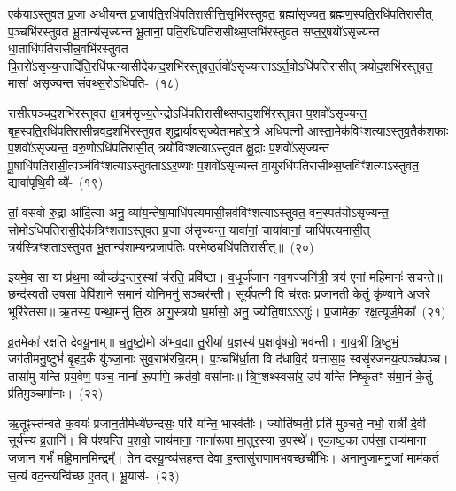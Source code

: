एक॑याऽस्तुवत प्र॒जा अ॑धीयन्त प्र॒जा\-प॑ति॒रधि॑\-पतिरासीत्ति॒सृभि॑\-रस्तुवत॒ ब्रह्मा॑सृज्यत॒ ब्रह्म॑ण॒स्पति॒रधि॑\-पतिरासीत् प॒ञ्चभि॑\-रस्तुवत भू॒तान्य॑सृज्यन्त भू॒तानां॒ पति॒रधि॑\-पतिरासीथ्स॒प्तभि॑\-रस्तुवत सप्त॒र्॒\mbox{}षयो॑\-ऽ\-सृज्यन्त धा॒ताधि॑\-पतिरा\-सीन्न॒वभि॑\-रस्तुवत पि॒तरो॑\-ऽसृज्य॒न्ता\-दि॑ति॒\-रधि॑\-पत्न्यासीदेकाद॒शभि॑\-रस्तुवत॒र्तवो॑\-ऽसृज्यन्ता\-ऽऽ\-र्त॒वो\-ऽधि॑\-पतिरासीत् त्रयोद॒शभि॑\-रस्तुवत॒ मासा॑ असृज्यन्त संवथ्स॒रो\-ऽधि॑\-पति-~(१८)\ip

रासीत्पञ्चद॒शभि॑\-रस्तुवत क्ष॒त्रम॑सृज्य॒तेन्द्रो\-ऽधि॑\-पतिरासीथ्सप्त\-द॒शभि॑\-रस्तुवत प॒शवो॑\-ऽसृज्यन्त॒ बृह॒स्पति॒\-रधि॑\-पतिरासी\-न्नव\-द॒शभि॑\-रस्तुवत शूद्रा॒र्याव॑सृज्येतामहोरा॒त्रे अधि॑पत्नी आस्ता॒\-मेक॑\-विꣳशत्या\-ऽ\-स्तुव॒तैक॑शफाः प॒शवो॑\-ऽसृज्यन्त॒ वरु॒णो\-ऽधि॑\-पतिरासी॒त् त्रयो॑\-विꣳशत्या\-ऽ\-स्तुवत क्षु॒द्राः प॒शवो॑\-ऽसृज्यन्त पू॒षाधि॑\-पतिरासी॒त्पञ्च॑विꣳशत्या\-ऽ\-स्तुवता\-ऽऽ\-र॒ण्याः प॒शवो॑\-ऽसृज्यन्त वा॒यु\-रधि॑\-पतिरासीथ्स॒प्तविꣳ॑शत्या\-ऽ\-स्तुवत॒ द्यावा॑\-पृथि॒वी व्यै॑-~(१९)\ip

तां॒ वस॑वो रु॒द्रा आ॑दि॒त्या अनु॒ व्या॑य॒न्तेषा॒माधि॑\-पत्यमासी॒न्नव॑\-विꣳशत्या\-ऽ\-स्तुवत॒ वन॒स्पत॑यो\-ऽसृज्यन्त॒ सोमो\-ऽ\-धि॑\-पतिरासी॒देक॑त्रिꣳशता\-ऽ\-स्तुवत प्र॒जा अ॑सृज्यन्त॒ यावा॑नां॒ चाया॑वानां॒ चाधि॑पत्यमासी॒त् त्रय॑स्त्रिꣳशता\-ऽ\-स्तुवत भू॒तान्य॑शाम्यन्प्र॒जा\-प॑तिः परमे॒ष्ठ्यधि॑\-पतिरासीत्॥~(२०)\ip

{\anuvakamend[{सं॒ व॒थ्स॒रो\-ऽधि॑\-पति॒र्वि पञ्च॑त्रिꣳशच्च}]}%

इ॒यमे॒व सा या प्र॑थ॒मा व्यौच्छ॑द॒न्तर॒स्यां च॑रति॒ प्रवि॑ष्टा। व॒धूर्ज॑जान नव॒गज्जनि॑त्री॒ त्रय॑ एनां महि॒मानः॑ सचन्ते॥ छन्द॑स्वती उ॒षसा॒ पेपि॑शाने समा॒नं योनि॒मनु॑ स॒ञ्चर॑न्ती। सूर्य॑पत्नी॒ वि च॑रतः प्रजान॒ती के॒तुं कृ॑ण्वा॒ने अ॒जरे॒ भूरि॑रेतसा॥ ऋ॒तस्य॒ पन्था॒मनु॑ ति॒स्र आगु॒स्त्रयो॑ घ॒र्मासो॒ अनु॒ ज्योति॒षा\-ऽऽ\-ऽगुः॑। प्र॒जामेका॒ रक्ष॒त्यूर्ज॒मेका᳚~(२१)\ip

व्र॒तमेका॑ रक्षति देवयू॒नाम्॥ च॒तु॒ष्टो॒मो अ॑भव॒द्या तु॒रीया॑ य॒ज्ञस्य॑ प॒क्षावृ॑षयो॒ भव॑न्ती। गा॒य॒त्रीं त्रि॒ष्टुभं॒ जग॑तीमनु॒ष्टुभं॑ बृ॒हद॒र्कं यु॑ञ्जा॒नाः सुव॒राभ॑रन्नि॒दम्॥ प॒ञ्चभि॑र्धा॒ता वि द॑धावि॒दं यत्तासा॒ꣴ॒ स्वसॄ॑रजनय॒त्पञ्च॑पञ्च। तासा॑मु यन्ति प्रय॒वेण॒ पञ्च॒ नाना॑ रू॒पाणि॒ क्रत॑वो॒ वसा॑नाः॥ त्रि॒ꣳ॒शथ्स्वसा॑र॒ उप॑ यन्ति निष्कृ॒तꣳ स॑मा॒नं के॒तुं प्र॑तिमु॒ञ्चमा॑नाः।~(२२)\ip

ऋ॒तूꣴस्त॑न्वते क॒वयः॑ प्रजान॒तीर्मध्ये॑छन्दसः॒ परि॑ यन्ति॒ भास्व॑तीः। ज्योति॑ष्मती॒ प्रति॑ मुञ्चते॒ नभो॒ रात्री॑ दे॒वी सूर्य॑स्य व्र॒तानि॑। वि प॑श्यन्ति प॒शवो॒ जाय॑माना॒ नाना॑रूपा मा॒तुर॒स्या उ॒पस्थे᳚। ए॒का॒ष्ट॒का तप॑सा॒ तप्य॑माना ज॒जान॒ गर्भं॑ महि॒मान॒मिन्द्रम्᳚। तेन॒ दस्यू॒न्व्य॑सहन्त दे॒वा ह॒न्तासु॑राणामभव॒च्छची॑भिः। अना॑नुजामनु॒जां माम॑कर्त स॒त्यं वद॒न्त्यन्वि॑च्छ ए॒तत्। भू॒यास॑-~(२३)\ip


